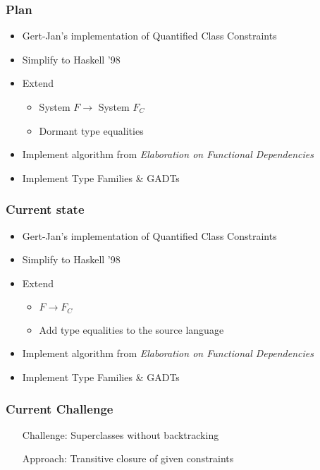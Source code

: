 \documentclass{beamer}
\begin{document}
\begin{frame}
    \frametitle{Plan}
    \begin{itemize}
        \item Gert-Jan's implementation of Quantified Class Constraints
        \item Simplify to Haskell '98
        \item Extend
            \begin{itemize}
                \item System $F \rightarrow$ System $F_C$
                \item Dormant type equalities
            \end{itemize}
        \item Implement algorithm from \textit{Elaboration on Functional Dependencies}
        \item Implement Type Families \& GADTs
    \end{itemize}
\end{frame}

\begin{frame}[fragile]
    \frametitle{Current state}
    \begin{itemize}
        \item Gert-Jan's implementation of Quantified Class Constraints
        \item Simplify to Haskell '98
        \color{lightgray}
        \item {Extend}
            \begin{itemize}
                \color{lightgray}
                \item $F \rightarrow F_C$
                \item Add type equalities to the source language
            \end{itemize}
        \item Implement algorithm from \textit{Elaboration on Functional Dependencies}
        \item Implement Type Families \& GADTs
    \end{itemize}
\end{frame}

\begin{frame}
    \frametitle{Current Challenge}
    \begin{itemize}
        \item[Challenge:] Superclasses without backtracking
        \item[Approach:] Transitive closure of given constraints
    \end{itemize}
\end{frame}
\end{document}

